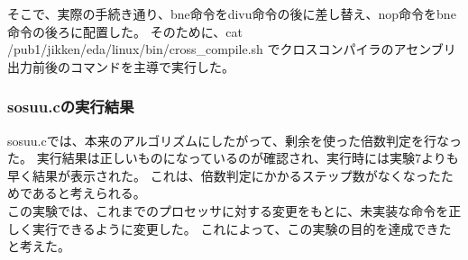 そこで、実際の手続き通り、bne命令をdivu命令の後に差し替え、nop命令をbne命令の後ろに配置した。
そのために、cat /pub1/jikken/eda/linux/bin/cross\_compile.sh でクロスコンパイラのアセンブリ出力前後のコマンドを主導で実行した。

\subsubsection{sosuu.cの実行結果}
sosuu.cでは、本来のアルゴリズムにしたがって、剰余を使った倍数判定を行なった。
実行結果は正しいものになっているのが確認され、実行時には実験7よりも早く結果が表示された。
これは、倍数判定にかかるステップ数がなくなったためであると考えられる。\\

この実験では、これまでのプロセッサに対する変更をもとに、未実装な命令を正しく実行できるように変更した。
これによって、この実験の目的を達成できたと考えた。
